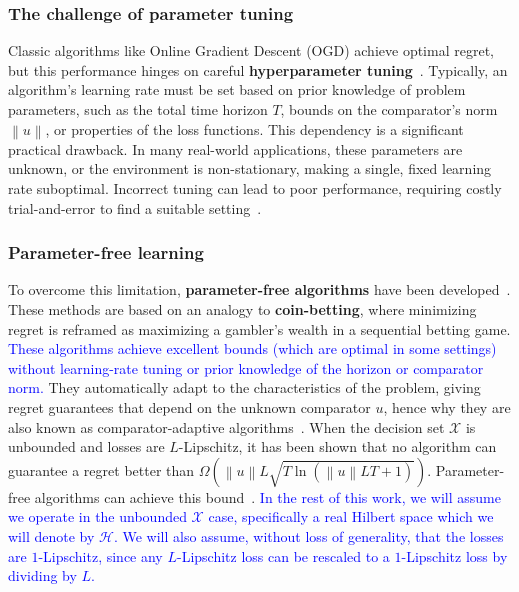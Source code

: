 \documentclass[journal]{IEEEtran}
\newcommand{\br}[1]{\left(#1\right)}
\newcommand{\norm}[1]{\left\lVert{#1}\right\rVert}
\newcommand{\Hil}{\mathcal{H}} %
\begin{document}
\subsubsection*{The challenge of parameter tuning}
Classic algorithms like Online Gradient Descent (OGD) achieve optimal regret, but this performance hinges on careful \textbf{hyperparameter tuning}~\cite{hazan_introduction_2023}.
Typically, an algorithm's learning rate must be set based on prior knowledge of problem parameters, such as the total time horizon $T$, bounds on the comparator's norm $\norm{u}$, or properties of the loss functions.
This dependency is a significant practical drawback.
In many real-world applications, these parameters are unknown, or the environment is non-stationary, making a single, fixed learning rate suboptimal.
Incorrect tuning can lead to poor performance, requiring costly trial-and-error to find a suitable setting~\cite{orabona_coin_2016}.

\subsubsection*{Parameter-free learning}
To overcome this limitation, \textbf{parameter-free algorithms} have been developed~\cite{mcmahan_no-regret_2012,mcmahan_unconstrained_2014,orabona_coin_2016,cutkosky_online_2017}.
These methods are based on an analogy to \textbf{coin-betting}, where minimizing regret is reframed as maximizing a gambler's wealth in a sequential betting game.
\textcolor{blue}{These algorithms achieve excellent bounds (which are optimal in some settings) without learning-rate tuning or prior knowledge of the horizon or comparator norm.}
They automatically adapt to the characteristics of the problem, giving regret guarantees that depend on the unknown comparator $u$, hence why they are also known as comparator-adaptive algorithms~\cite{van_der_hoeven_comparator-adaptive_2020, hoeven_distributed_2021}.
When the decision set $\mathcal{X}$ is unbounded and losses are $L$-Lipschitz, it has been shown that no algorithm can guarantee a regret better than $\Omega\br{\norm{u}L \sqrt{T \ln(\norm{u} LT + 1)}}$.
Parameter-free algorithms can achieve this bound~\cite{mcmahan_no-regret_2012}.
\textcolor{blue}{In the rest of this work, we will assume we operate in the unbounded $\mathcal{X}$ case, specifically a real Hilbert space which we will denote by $\Hil$.
    We will also assume, without loss of generality, that the losses are $1$-Lipschitz, since any $L$-Lipschitz loss can be rescaled to a $1$-Lipschitz loss by dividing by $L$.}
\end{document}
